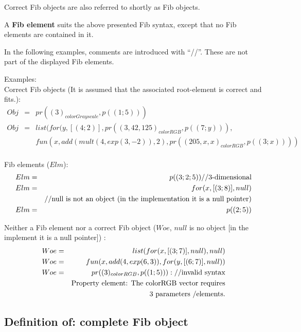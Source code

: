 Correct Fib objects are also referred to shortly as Fib objects.

\bigskip\noindent
A \textbf{Fib element} suits the above presented Fib syntax, except that no Fib elements are contained in it.

\bigskip\noindent
In the following examples, comments are introduced with ``//''. These are not part of the displayed Fib elements.

\begin{flushleft}
Examples:\\
Correct Fib objects (It is assumed that the associated root-element is correct and fits.):
\begin{eqnarray*}
Obj &=& pr( (3)_{colorGrayscale}, p((1;5)))\\
Obj &=& list( for(y,[(4;2)], pr( (3, 42, 125)_{colorRGB} , p((7;y))), \\
&& fun(x,add( mult(4, exp( 3, -2)), 2 ), pr( (205, x ,x)_{colorRGB}, p((3;x)) ) )\\
\end{eqnarray*}

Fib elements ($Elm$):
\begin{eqnarray*}
Elm &=& p((3;2;5)) \textnormal{//3-dimensional}\\
Elm &=& for(x,[(3;8)],null) \\
& & \textnormal{//null is not an object (in the implementation it is a null pointer)}\\
Elm &=& p((2;5))\\
\end{eqnarray*}

Neither a Fib element nor a correct Fib object ($Woe$, $null$ is no object [in the implement it is a null pointer]) :\\
\begin{eqnarray*}
Woe &=& list( for( x, [(3;7)], null), null)\\
Woe &=& fun( x, add(4, exp(6, 3) ) , for(y, [(6;7)], null))\\
Woe &=& pr( (3)_{colorRGB}, p((1;5)) ): \textnormal{//invalid syntax} \\
&& \textnormal{Property element: The colorRGB vector requires}\\
&& \textnormal{3 parameters /elements.}\\
\end{eqnarray*}

\end{flushleft}


\subsection{Definition of: complete Fib object}
\label{secFullFibObject}

